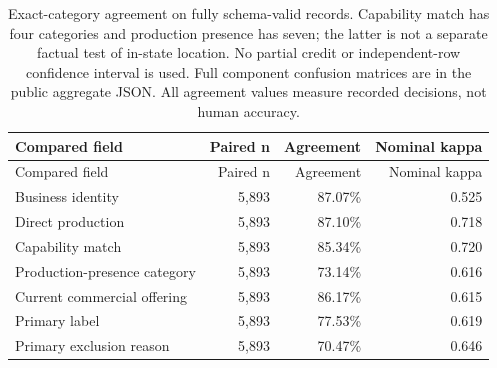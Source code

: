 \documentclass[10pt]{article}
\begin{document}
\begin{longtable}[]{@{}lrrr@{}}
\caption{Exact-category agreement on fully schema-valid records. Capability match has four categories and production presence has seven; the latter is not a separate factual test of in-state location. No partial credit or independent-row confidence interval is used. Full component confusion matrices are in the public aggregate JSON. All agreement values measure recorded decisions, not human accuracy.}\tabularnewline
\toprule\noalign{}
Compared field & Paired n & Agreement & Nominal kappa \\
\midrule\noalign{}
\endfirsthead
\toprule\noalign{}
Compared field & Paired n & Agreement & Nominal kappa \\
\midrule\noalign{}
\endhead
\bottomrule\noalign{}
\endlastfoot
Business identity & 5,893 & 87.07\% & 0.525 \\
Direct production & 5,893 & 87.10\% & 0.718 \\
Capability match & 5,893 & 85.34\% & 0.720 \\
Production-presence category & 5,893 & 73.14\% & 0.616 \\
Current commercial offering & 5,893 & 86.17\% & 0.615 \\
Primary label & 5,893 & 77.53\% & 0.619 \\
Primary exclusion reason & 5,893 & 70.47\% & 0.646 \\
\end{longtable}
\end{document}
